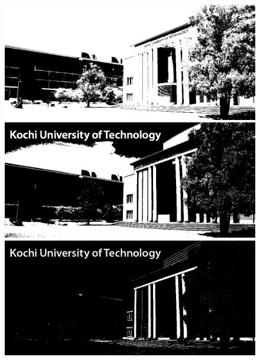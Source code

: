 \begin{figure}[H]
    \centering
    \begin{minipage}[b]{.7\textwidth}
        \centering
        \begin{minipage}[b]{.3\textwidth}
            \centering
            \includegraphics[keepaspectratio,width=\textwidth]{../../Figures/05_41.png}
        \end{minipage}
        \begin{minipage}[b]{.3\textwidth}
            \centering
            \includegraphics[keepaspectratio,width=\textwidth]{../../Figures/05_42.png}
        \end{minipage}
        \begin{minipage}[b]{.3\textwidth}
            \centering
            \includegraphics[keepaspectratio,width=\textwidth]{../../Figures/05_43.png}

\end{minipage}
\end{minipage}
\end{figure}
